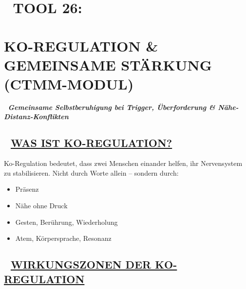 %


\hypertarget{tool-26}{%
\section{\texorpdfstring{🧠 \textbf{TOOL 26:} }{🧠 TOOL 26: }}\label{tool-26}}

\hypertarget{ko-regulation-gemeinsame-stuxe4rkung-ctmm-modul}{%
\section{\texorpdfstring{\textbf{KO-REGULATION \& GEMEINSAME STÄRKUNG (CTMM-MODUL)}}{KO-REGULATION \& GEMEINSAME STÄRKUNG (CTMM-MODUL)}}\label{ko-regulation-gemeinsame-stuxe4rkung-ctmm-modul}}

🧩 \emph{\textbf{Gemeinsame Selbstberuhigung bei Trigger, Überforderung \& Nähe-Distanz-Konflikten}}

\hypertarget{was-ist-ko-regulation}{%
\subsection{\texorpdfstring{🤝 \textbf{\ul{WAS IST KO-REGULATION?}}}{🤝 WAS IST KO-REGULATION?}}\label{was-ist-ko-regulation}}

Ko-Regulation bedeutet, dass zwei Menschen einander helfen, ihr Nervensystem zu stabilisieren. Nicht durch Worte allein -- sondern durch:

\begin{itemize}
\tightlist
\item
  Präsenz
\item
  Nähe ohne Druck
\item
  Gesten, Berührung, Wiederholung
\item
  Atem, Körpersprache, Resonanz
\end{itemize}

\hypertarget{wirkungszonen-der-ko-regulation}{%
\subsection{\texorpdfstring{💞 \textbf{\ul{WIRKUNGSZONEN DER KO-REGULATION}}}{💞 WIRKUNGSZONEN DER KO-REGULATION}}\label{wirkungszonen-der-ko-regulation}}

